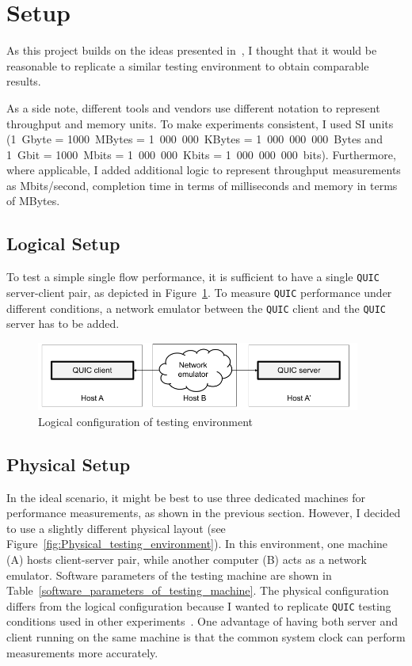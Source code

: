 \documentclass[12pt,a4paper]{report}
\begin{document}
\section{Setup}

As this project builds on the ideas presented in~\cite{Making_QUIC_Quicker}, I thought that it would be reasonable to replicate a similar testing environment to obtain comparable results.

As a side note, different tools and vendors use different notation to represent throughput and memory units.
To make experiments consistent, I used SI units (1~Gbyte = 1000~MBytes = 1~000~000~KBytes = 1~000~000~000~Bytes and 1~Gbit = 1000~Mbits = 1~000~000~Kbits = 1~000~000~000~bits).
Furthermore, where applicable, I added additional logic to represent throughput measurements as Mbits/second, completion time in terms of milliseconds and memory in terms of MBytes.

\subsection{Logical Setup}
To test a simple single flow performance, it is sufficient to have a single \texttt{QUIC} server-client pair, as depicted in Figure~\ref{fig:Logical_testing_environment}.
To measure \texttt{QUIC} performance under different conditions, a network emulator between the \texttt{QUIC} client and the \texttt{QUIC} server has to be added.

    \begin{figure}[ht]
    \centering
    \includegraphics[width=0.95\textwidth]{figs/Logical_testing_environment.png}
    \caption{Logical configuration of testing environment}
    \label{fig:Logical_testing_environment}
    \end{figure}

\subsection{Physical Setup} \label{physical_setup_subsection}


    In the ideal scenario, it might be best to use three dedicated machines for performance measurements, as shown in the previous section.
    However, I decided to use a slightly different physical layout (see Figure~\ref{fig:Physical_testing_environment}).
    In this environment, one machine (A) hosts client-server pair, while another computer (B) acts as a network emulator.
    Software parameters of the testing machine are shown in Table~\ref{software_parameters_of_testing_machine}.
    The physical configuration differs from the logical configuration because I wanted to replicate \texttt{QUIC} testing conditions used in other experiments~\cite{Making_QUIC_Quicker}.
    One advantage of having both server and client running on the same machine is that the common system clock can perform measurements more accurately. 
    
\end{document}
